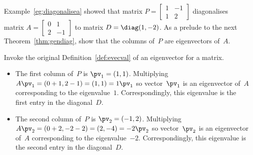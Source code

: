 \begin{example} \label{eg:}
Example~\ref{eg:diagonalisea} showed that matrix \(P=\begin{bmatrix} 1&-1\\1&2 \end{bmatrix}\) diagonalises matrix \(A=\begin{bmatrix} 0&1\\2&-1 \end{bmatrix}\) to matrix \(D=\diag(1,-2)\). 
As a prelude to the next Theorem~\ref{thm:gendiag}, show that the columns of~\(P\) are eigenvectors of~\(A\).
\begin{solution} Invoke the original Definition~\ref{def:evecval} of an eigenvector for a matrix.
\begin{itemize}
\item The first column of~\(P\) is \(\pv_1=(1,1)\).
Multiplying \(A\pv_1=(0+1,2-1)=(1,1)=1\pv_1\) so vector~\(\pv_1\) is an eigenvector of~\(A\) corresponding to the eigenvalue~\(1\).
Correspondingly, this eigenvalue is the first entry in the diagonal~\(D\).

\item The second column of~\(P\) is \(\pv_2=(-1,2)\).
Multiplying \(A\pv_2=(0+2,-2-2)=(2,-4)=-2\pv_2\) so vector~\(\pv_2\) is an eigenvector of~\(A\) corresponding to the eigenvalue~\(-2\).
Correspondingly, this eigenvalue is the second entry in the diagonal~\(D\).
\end{itemize}
\end{solution}
\end{example}




